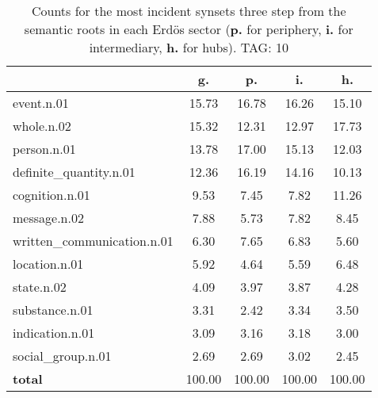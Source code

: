 \begin{table}[h!]
\begin{center}
\begin{tabular}{| l || c | c | c | c |}\hline
 & {\bf g.} & {\bf p.} & {\bf i.} & {\bf h.} \\\hline\hline
event.n.01 & 15.73  & 16.78  & 16.26  & 15.10 \\\hline
whole.n.02 & 15.32  & 12.31  & 12.97  & 17.73 \\\hline
person.n.01 & 13.78  & 17.00  & 15.13  & 12.03 \\\hline
definite\_quantity.n.01 & 12.36  & 16.19  & 14.16  & 10.13 \\\hline
cognition.n.01 & 9.53  & 7.45  & 7.82  & 11.26 \\\hline
message.n.02 & 7.88  & 5.73  & 7.82  & 8.45 \\\hline
written\_communication.n.01 & 6.30  & 7.65  & 6.83  & 5.60 \\\hline
location.n.01 & 5.92  & 4.64  & 5.59  & 6.48 \\\hline
state.n.02 & 4.09  & 3.97  & 3.87  & 4.28 \\\hline
substance.n.01 & 3.31  & 2.42  & 3.34  & 3.50 \\\hline
indication.n.01 & 3.09  & 3.16  & 3.18  & 3.00 \\\hline
social\_group.n.01 & 2.69  & 2.69  & 3.02  & 2.45 \\\hline\hline
{{\bf total}} & 100.00  & 100.00  & 100.00  & 100.00 \\\hline
\end{tabular}
\caption{Counts for the most incident synsets three step from the semantic roots in each Erd\"os sector ({\bf p.} for periphery, {\bf i.} for intermediary, {\bf h.} for hubs). TAG: 10}
\end{center}
\end{table}